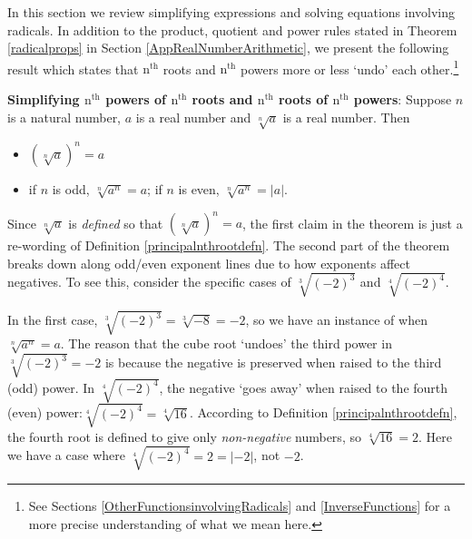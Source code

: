 \documentclass{ximera}
\begin{document}
	\author{Stitz-Zeager}




\setcounter{footnote}{0}

\label{AppRadEqus}

In this section we review simplifying expressions and solving equations involving radicals.  In addition to the product, quotient and power rules stated in Theorem \ref{radicalprops} in Section \ref{AppRealNumberArithmetic},  we present the following result which states that $\text{n}^{\text{th}}$ roots and $\text{n}^{\text{th}}$ powers more or less `undo' each other.\footnote{See Sections \ref{OtherFunctionsinvolvingRadicals} and \ref{InverseFunctions} for a more precise understanding of what we mean here.} 

 


\begin{theorem}\label{simplifyradicals} \textbf{Simplifying $\text{n}^{\text{th}}$ powers of $\text{n}^{\text{th}}$ roots and $\text{n}^{\text{th}}$ roots of $\text{n}^{\text{th}}$ powers}:  Suppose $n$ is a natural number, $a$ is a real number and $\sqrt[n]{a}$ is a real number.  Then

\begin{itemize}

\item $(\sqrt[n]{a})^{n} = a$

\item  if $n$ is odd, $\sqrt[n]{a^{n}} = a$; if $n$ is even, $\sqrt[n]{a^{n}} = |a|$.

\end{itemize}

\end{theorem}


 

Since $\sqrt[n]{a}$ is \textit{defined} so that $(\sqrt[n]{a})^n = a$,  the first claim in the theorem is just a re-wording of  Definition \ref{principalnthrootdefn}.  The second part of the theorem breaks down along odd/even exponent lines due to how exponents affect negatives. To see this, consider the specific cases of $\sqrt[3]{(-2)^3}$ and $\sqrt[4]{(-2)^{4}}$.  

 

In the first case,  $\sqrt[3]{(-2)^3} =\sqrt[3]{-8} = -2$, so we have an instance of when $\sqrt[n]{a^{n}} = a$.  The reason that the cube root `undoes' the third power in $\sqrt[3]{(-2)^3} = -2$ is because the negative is preserved when raised to the third (odd) power.  In  $\sqrt[4]{(-2)^{4}}$,  the negative `goes away' when raised to the fourth (even) power:$\sqrt[4]{(-2)^{4}} = \sqrt[4]{16}$.  According to Definition \ref{principalnthrootdefn}, the fourth root is defined to give only \textit{non-negative} numbers, so $\sqrt[4]{16} = 2$.  Here we have a case where $\sqrt[4]{(-2)^{4}} = 2 = |-2|$, not $-2$. 
\end{document}
